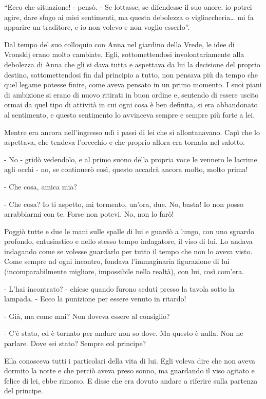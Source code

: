 ``Ecco che situazione! - pensò. - Se lottasse, se difendesse il suo onore, io potrei agire, dare sfogo ai miei sentimenti, ma questa debolezza o vigliaccheria\ldots{} mi fa apparire un traditore, e io non volevo e non voglio esserlo''. 

Dal tempo del suo colloquio con Anna nel giardino della Vrede, le idee di Vronskij erano molto cambiate. Egli, sottomettendosi involontariamente alla debolezza di Anna che gli si dava tutta e aspettava da lui la decisione del proprio destino, sottomettendosi fin dal principio a tutto, non pensava più da tempo che quel legame potesse finire, come aveva pensato in un primo momento. I suoi piani di ambizione si erano di nuovo ritirati in buon ordine e, sentendo di essere uscito ormai da quel tipo di attività in cui ogni cosa è ben definita, si era abbandonato al sentimento, e questo sentimento lo avvinceva sempre e sempre più forte a lei. 

Mentre era ancora nell'ingresso udì i passi di lei che si allontanavano. Capì che lo aspettava, che tendeva l'orecchio e che proprio allora era tornata nel salotto. 

- No - gridò vedendolo, e al primo suono della propria voce le vennero le lacrime agli occhi - no, se continuerò così, questo accadrà ancora molto, molto prima! 

- Che cosa, amica mia? 

- Che cosa? Io ti aspetto, mi tormento, un'ora, due. No, basta! Io non posso arrabbiarmi con te. Forse non potevi. No, non lo farò! 

Poggiò tutte e due le mani sulle spalle di lui e guardò a lungo, con uno sguardo profondo, entusiastico e nello stesso tempo indagatore, il viso di lui. Lo andava indagando come se volesse guardarlo per tutto il tempo che non lo aveva visto. Come sempre ad ogni incontro, fondava l'immaginaria figurazione di lui (incomparabilmente migliore, impossibile nella realtà), con lui, così com'era. 

\label{iii-3} 

- L'hai incontrato? - chiese quando furono seduti presso la tavola sotto la lampada. - Ecco la punizione per essere venuto in ritardo! 

- Già, ma come mai? Non doveva essere al consiglio? 

- C'è stato, ed è tornato per andare non so dove. Ma questo è nulla. Non ne parlare. Dove sei stato? Sempre col principe? 

Ella conosceva tutti i particolari della vita di lui. Egli voleva dire che non aveva dormito la notte e che perciò aveva preso sonno, ma guardando il viso agitato e felice di lei, ebbe rimorso. E disse che era dovuto andare a riferire sulla partenza del principe. 


